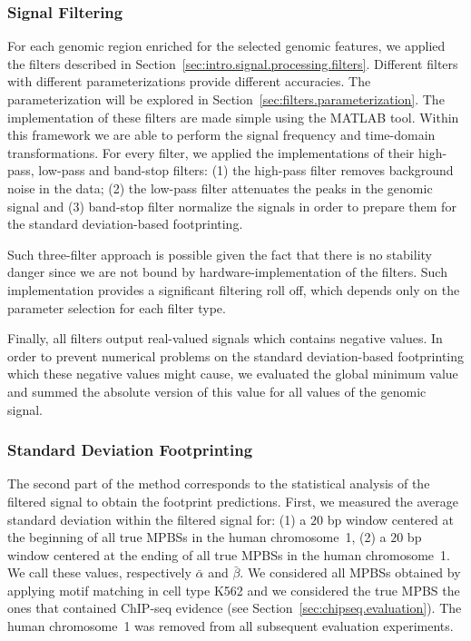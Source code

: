 \subsubsection{Signal Filtering}
\label{sec:signal.filtering}

For each genomic region enriched for the selected genomic features, we applied the filters described in Section~\ref{sec:intro.signal.processing.filters}. Different filters with different parameterizations provide different accuracies. The parameterization will be explored in Section~\ref{sec:filters.parameterization}. The implementation of these filters are made simple using the MATLAB tool. Within this framework we are able to perform the signal frequency and time-domain transformations. For every filter, we applied the implementations of their high-pass, low-pass and band-stop filters: (1) the high-pass filter removes background noise in the data; (2) the low-pass filter attenuates the peaks in the genomic signal and (3) band-stop filter normalize the signals in order to prepare them for the standard deviation-based footprinting.

Such three-filter approach is possible given the fact that there is no stability danger since we are not bound by hardware-implementation of the filters. Such implementation provides a significant filtering roll off, which depends only on the parameter selection for each filter type.

Finally, all filters output real-valued signals which contains negative values. In order to prevent numerical problems on the standard deviation-based footprinting which these negative values might cause, we evaluated the global minimum value and summed the absolute version of this value for all values of the genomic signal.

\subsubsection{Standard Deviation Footprinting}
\label{sec:standard.deviation.footprinting}

The second part of the method corresponds to the statistical analysis of the filtered signal to obtain the footprint predictions. First, we measured the average standard deviation within the filtered signal for: (1) a $20$ bp window centered at the beginning of all true MPBSs in the human chromosome~1, (2) a $20$ bp window centered at the ending of all true MPBSs in the human chromosome~1. We call these values, respectively $ \bar{\alpha} $ and $ \bar{\beta} $. We considered all MPBSs obtained by applying motif matching in cell type K562 and we considered the true MPBS the ones that contained ChIP-seq evidence (see Section~\ref{sec:chipseq.evaluation}). The human chromosome~1 was removed from all subsequent evaluation experiments.

